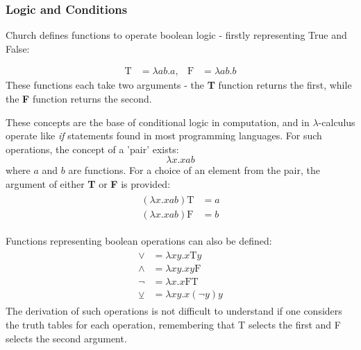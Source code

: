 \documentclass[Master.tex]{subfiles}
\begin{document}
\subsubsection{Logic and Conditions}

Church defines functions to operate boolean logic - firstly representing True and False:
    
\begin{equation*}
\begin{aligned}
\bm{\mathrm{T}} &= \lambda ab.a,
  & %
\bm{\mathrm{F}} &= \lambda ab.b
\end{aligned}
\end{equation*}
These functions each take two arguments - the \textbf{T} function returns the first, while the \textbf{F} function returns the second.

These concepts are the base of conditional logic in computation, and in $\lambda$-calculus operate like \textit{if} statements found in most programming languages. For such operations, the concept of a 'pair' exists:
\begin{equation*}
\lambda x.xab
\end{equation*}
where $a$ and $b$ are functions. For a choice of an element from the pair, the argument of either \textbf{T} or \textbf{F} is provided:
\begin{gather*}
\begin{aligned}
(\lambda x.xab)\bm{\mathrm{T}} &= a\\
(\lambda x.xab)\bm{\mathrm{F}} &= b
\end{aligned}
\end{gather*}

Functions representing boolean operations can also be defined:
\begin{gather*}
\begin{aligned}
\vee &= \lambda xy.x\bm{\mathrm{T}}y\\
\wedge &= \lambda xy.xy\bm{\mathrm{F}}\\
\lnot &= \lambda x.x\bm{\mathrm{FT}} \\
\veebar &= \lambda xy.x(\lnot y)y
\end{aligned}
\end{gather*}
The derivation of such operations is not difficult to understand if one considers the truth tables for each operation, remembering that T selects the first and F selects the second argument.
\end{document}
